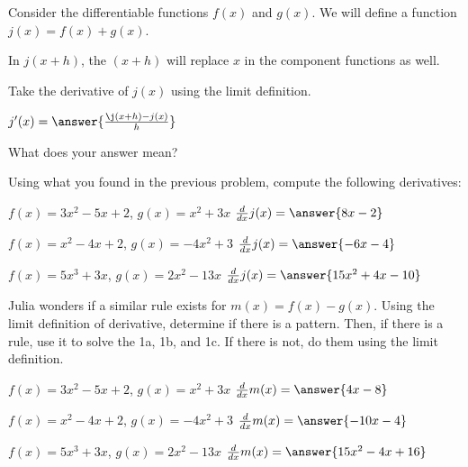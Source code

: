 \documentclass{ximera}
\begin{document}
\begin{question}
Consider the differentiable functions $f(x)$ and $g(x)$. We will define a function $j(x) = f(x) + g(x)$.

\begin{hint}
In $j(x+h)$, the $(x+h)$ will replace $x$ in the component functions as well.
\end{hint}
Take the derivative of $j(x)$ using the limit definition.

$j'(x) =  \answer{\frac{\j(x+h)-j(x)}{h}}$

What does your answer mean?

\begin{freeResponse}
\end{freeResponse}
\end{question}
\begin{question}
Using what you found in the previous problem, compute the following derivatives:

$f(x) = 3x^2 - 5x + 2$, $g(x) = x^2 + 3x$ \hspace{11mm} $\frac{d}{dx}j(x) =  \answer{8x-2}$

$f(x) = x^2 - 4x + 2$, $g(x) = -4x^2 + 3$ \hspace{10mm} $\frac{d}{dx}j(x) = \answer{-6x-4}$

$f(x) = 5x^3 + 3x$, $g(x) = 2x^2 - 13x$ \hspace{13mm} $\frac{d}{dx}j(x) =  \answer{15x^2+4x-10}$
\end{question}
\begin{question}
Julia wonders if a similar rule exists for $m(x) = f(x)-g(x)$. Using the limit definition of derivative, determine if there is a pattern. Then, if there is a rule, use it to solve the 1a, 1b, and 1c. If there is not, do them using the limit definition.

$f(x) = 3x^2 - 5x + 2$, $g(x) = x^2 + 3x$ \hspace{11mm} $\frac{d}{dx}m(x) =  \answer{4x-8}$

$f(x) = x^2 - 4x + 2$, $g(x) = -4x^2 + 3$ \hspace{10mm} $\frac{d}{dx}m(x) =  \answer{-10x-4}$

$f(x) = 5x^3 + 3x$, $g(x) = 2x^2 - 13x$ \hspace{13mm} $\frac{d}{dx}m(x) =  \answer{15x^2-4x+16}$
\end{question}
\end{document}

